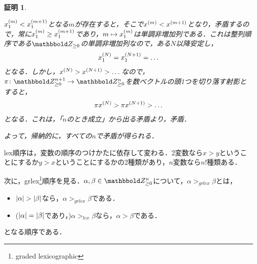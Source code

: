 \documentclass[9pt]{ltjsarticle}
\theoremstyle{break}
\theoremstyle{break}
\theoremstyle{break}
\theoremstyle{break}
\theoremstyle{break}
\theoremstyle{break}
\theoremstyle{break}
\theoremstyle{break}
\theoremstyle{break}
\theoremstyle{break}
\theoremstyle{break}
\theoremstyle{break}
\theoremstyle{break}
\theoremstyle{break}
\theoremstyle{break}
\theoremstyle{nonumberbreak}
\newtheorem{myproof}{証明}
\theoremstyle{nonumberbreak}
\begin{document}
\begin{myproof}
\begin{itemize}
\begin{itemize}
$x_1^{(m)}<x_1^{(m+1)}$となる$m$が存在すると，そこで$x^{(m)}<x^{(m+1)}$となり，矛盾するので，常に$x_1^{(m)}\ge x_1^{(m+1)}$であり，$m\mapsto x_1^{(m)}$は単調非増加列である．これは整列順序である$\Zge$の単調非増加列なので，ある$N$以降安定し，
\begin{align}
 x_1^{(N)} = x_1^{(N+1)} = \dots
\end{align}
となる．しかし，$x^{(N)}>x^{(N+1)}>\dots$なので，$\pi\colon \Zge^{n+1} \to \Zge^{n}$を数ベクトルの頭1つを切り落す射影とすると，
\begin{align}
 \pi x^{(N)} > \pi x^{(N+1)} > \dots
\end{align}
となる．これは，「$n$のとき成立」から出る矛盾より，矛盾．
\end{itemize}
よって，帰納的に，すべての$n$で矛盾が得られる．
 \end{itemize}
\end{myproof}

lex順序は，変数の順序のつけかたに依存して変わる．2変数なら$x>y$ということにするか$y>x$ということにするかの2種類があり，$n$変数なら$n!$種類ある．

次に，grlex\footnote{graded lexicographic}順序を見る．$\alpha,\beta \in \Zge^n$について，$\alpha >_{grlex} \beta$とは，
\begin{itemize}
 \item $\myabs{\alpha}>\myabs{\beta}$なら，$\alpha >_{grlex}\beta$である．
 \item ($\left|\alpha\right|=\left|\beta\right|$であり，)$\alpha >_{lex} \beta$なら，$\alpha > \beta$である．
\end{itemize}
となる順序である．
\end{document}
